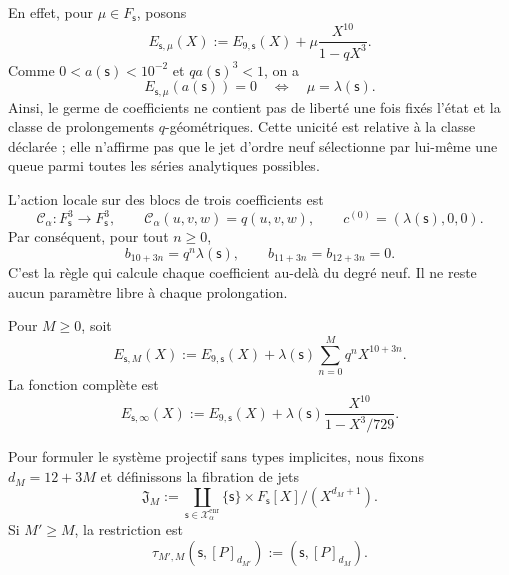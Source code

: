 En effet, pour \(\mu\in F_{\mathsf s}\), posons
\[
 E_{\mathsf s,\mu}(X)
 :=E_{9,\mathsf s}(X)+\mu\frac{X^{10}}{1-qX^3}.
\]
Comme \(0<a(\mathsf s)<10^{-2}\) et \(qa(\mathsf s)^3<1\), on a
\begin{equation}
 E_{\mathsf s,\mu}(a(\mathsf s))=0
 \quad\Longleftrightarrow\quad
 \mu=\lambda(\mathsf s).
 \label{eq:alpha-unicidad-lambda-clase-geometrica}
\end{equation}
Ainsi, le germe de coefficients ne contient pas de liberté une fois fixés l'état
et la classe de prolongements \(q\)-géométriques. Cette unicité est relative à la
classe déclarée ; elle n'affirme pas que le jet d'ordre neuf sélectionne par lui-même une
queue parmi toutes les séries analytiques possibles.

L'action locale sur des blocs de trois coefficients est
\begin{equation}
 \mathcal C_\alpha:F_{\mathsf s}^{3}\longrightarrow F_{\mathsf s}^{3},
 \qquad \mathcal C_\alpha(u,v,w)=q(u,v,w),
 \qquad c^{(0)}=(\lambda(\mathsf s),0,0).
 \label{eq:alpha-accion-coeficientes}
\end{equation}
Par conséquent, pour tout \(n\geq0\),
\begin{equation}
 b_{10+3n}=q^n\lambda(\mathsf s),\qquad
 b_{11+3n}=b_{12+3n}=0.
 \label{eq:alpha-recurrencia-coeficientes}
\end{equation}
C'est la règle qui calcule chaque coefficient au-delà du degré neuf. Il ne
reste aucun paramètre libre à chaque prolongation.

Pour \(M\geq0\), soit
\begin{equation}
 E_{\mathsf s,M}(X):=E_{9,\mathsf s}(X)
 +\lambda(\mathsf s)\sum_{n=0}^{M}q^nX^{10+3n}.
 \label{eq:alpha-truncamientos-completos}
\end{equation}
La fonction complète est
\begin{equation}
 E_{\mathsf s,\infty}(X)
 :=E_{9,\mathsf s}(X)
 +\lambda(\mathsf s)\frac{X^{10}}{1-X^3/729}.
 \label{eq:alpha-funcion-completa-explicita}
\end{equation}

Pour formuler le système projectif sans types implicites, nous fixons \(d_M=12+3M\) et définissons la fibration de jets
\begin{equation}
 \mathfrak J_M:=
 \coprod_{\mathsf s\in\mathcal X_\alpha^{\mathrm{enr}}}
 \{\mathsf s\}\times F_{\mathsf s}[X]/(X^{d_M+1}).
 \label{eq:alpha-espacio-jets-rev08}
\end{equation}
Si \(M'\ge M\), la restriction est
\begin{equation}
 \tau_{M',M}(\mathsf s,[P]_{d_{M'}})
 :=(\mathsf s,[P]_{d_M}).
 \label{eq:alpha-truncamiento-jets-rev08}
\end{equation}

